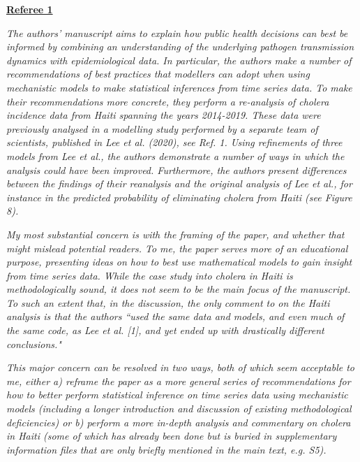 \documentclass[11pt]{article}
\newcommand\report[1]{{\color{mygreen} \vspace{1mm}\hspace{0.25in}\parbox{6in}{\em #1}}}
\begin{document}
\vspace{5mm}

\newpage


\begin{center}
{\large{\textbf{\underline{Referee 1}}}} %
\end{center}

\report{
  The authors' manuscript aims to explain how public health decisions can best be informed by combining an understanding of the underlying pathogen transmission dynamics with epidemiological data. In particular, the authors make a number of recommendations of best practices that modellers can adopt when using mechanistic models to make statistical inferences from time series data. To make their recommendations more concrete, they perform a re-analysis of cholera incidence data from Haiti spanning the years 2014-2019. These data were previously analysed in a modelling study performed by a separate team of scientists, published in Lee et al. (2020), see Ref. 1. Using refinements of three models from Lee et al., the authors demonstrate a number of ways in which the analysis could have been improved. Furthermore, the authors present differences between the findings of their reanalysis and the original analysis of Lee et al., for instance in the predicted probability of eliminating cholera from Haiti (see Figure 8).
}


\report{
  My most substantial concern is with the framing of the paper, and whether that might mislead potential readers. To me, the paper serves more of an educational purpose, presenting ideas on how to best use mathematical models to gain insight from time series data. While the case study into cholera in Haiti is methodologically sound, it does not seem to be the main focus of the manuscript. To such an extent that, in the discussion, the only comment to on the Haiti analysis is that the authors ``used the same data and models, and even much of the same code, as Lee et al. [1], and yet ended up with drastically different conclusions."
}


\report{
  This major concern can be resolved in two ways, both of which seem acceptable to me, either a) reframe the paper as a more general series of recommendations for how to better perform statistical inference on time series data using mechanistic models (including a longer introduction and discussion of existing methodological deficiencies) or b) perform a more in-depth analysis and commentary on cholera in Haiti (some of which has already been done but is buried in supplementary information files that are only briefly mentioned in the main text, e.g. S5).
}
\end{document}
